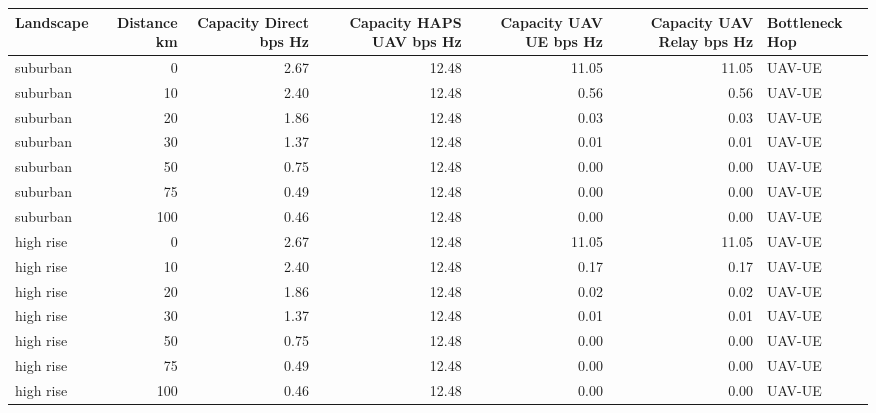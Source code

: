 \begin{tabular}{lrrrrrl}
\toprule
Landscape & Distance km & Capacity Direct bps Hz & Capacity HAPS UAV bps Hz & Capacity UAV UE bps Hz & Capacity UAV Relay bps Hz & Bottleneck Hop \\
\midrule
suburban & 0 & 2.67 & 12.48 & 11.05 & 11.05 & UAV-UE \\
suburban & 10 & 2.40 & 12.48 & 0.56 & 0.56 & UAV-UE \\
suburban & 20 & 1.86 & 12.48 & 0.03 & 0.03 & UAV-UE \\
suburban & 30 & 1.37 & 12.48 & 0.01 & 0.01 & UAV-UE \\
suburban & 50 & 0.75 & 12.48 & 0.00 & 0.00 & UAV-UE \\
suburban & 75 & 0.49 & 12.48 & 0.00 & 0.00 & UAV-UE \\
suburban & 100 & 0.46 & 12.48 & 0.00 & 0.00 & UAV-UE \\
high rise & 0 & 2.67 & 12.48 & 11.05 & 11.05 & UAV-UE \\
high rise & 10 & 2.40 & 12.48 & 0.17 & 0.17 & UAV-UE \\
high rise & 20 & 1.86 & 12.48 & 0.02 & 0.02 & UAV-UE \\
high rise & 30 & 1.37 & 12.48 & 0.01 & 0.01 & UAV-UE \\
high rise & 50 & 0.75 & 12.48 & 0.00 & 0.00 & UAV-UE \\
high rise & 75 & 0.49 & 12.48 & 0.00 & 0.00 & UAV-UE \\
high rise & 100 & 0.46 & 12.48 & 0.00 & 0.00 & UAV-UE \\
\bottomrule
\end{tabular}
